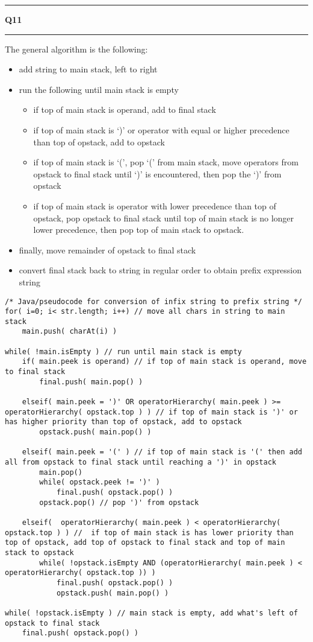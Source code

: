 \documentclass[11pt]{article}
\newcommand\question[2]{\vspace{.25in}\hrule\textbf{#1 #2}\vspace{.5em}\hrule\vspace{.10in}}
\begin{document}
\newpage
\question{Q11}{}
The general algorithm is the following:
\begin{itemize}
	\item add string to main stack, left to right
	\item run the following until main stack is empty
	\begin{itemize}
		\item if top of main stack is operand, add to final stack
		\item if top of main stack is `)' or operator with equal or higher precedence than top of opstack, add to opstack
		\item if top of main stack is `(', pop `(' from main stack, move operators from opstack to final stack until `)' is encountered, then pop the `)' from opstack
		\item if top of main stack is operator with lower precedence than top of opstack, pop opstack to final stack until top of main stack is no longer lower precedence, then pop top of main stack to opstack.
	\end{itemize}
	\item finally, move remainder of opstack to final stack
	\item convert final stack back to string in regular order to obtain prefix expression string	
\end{itemize}
\begin{lstlisting}
/* Java/pseudocode for conversion of infix string to prefix string */
for( i=0; i< str.length; i++) // move all chars in string to main stack
	main.push( charAt(i) )

while( !main.isEmpty ) // run until main stack is empty
	if( main.peek is operand) // if top of main stack is operand, move to final stack
		final.push( main.pop() )
	
	elseif( main.peek = ')' OR operatorHierarchy( main.peek ) >= operatorHierarchy( opstack.top ) ) // if top of main stack is ')' or has higher priority than top of opstack, add to opstack
		opstack.push( main.pop() )
	
	elseif( main.peek = '(' ) // if top of main stack is '(' then add all from opstack to final stack until reaching a ')' in opstack
		main.pop()
		while( opstack.peek != ')' )
			final.push( opstack.pop() )
		opstack.pop() // pop ')' from opstack
	
	elseif(  operatorHierarchy( main.peek ) < operatorHierarchy( opstack.top ) ) //  if top of main stack is has lower priority than top of opstack, add top of opstack to final stack and top of main stack to opstack
		while( !opstack.isEmpty AND (operatorHierarchy( main.peek ) < operatorHierarchy( opstack.top )) )
			final.push( opstack.pop() )
			opstack.push( main.pop() )

while( !opstack.isEmpty ) // main stack is empty, add what's left of opstack to final stack
	final.push( opstack.pop() )
\end{lstlisting}
\end{document}
